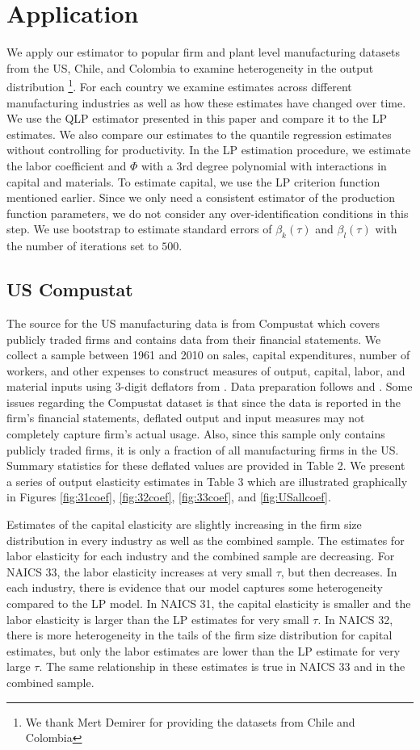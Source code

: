 \documentclass[11pt]{article}
\begin{document}
\section{Application} \label{application}
We apply our estimator to popular firm and plant level manufacturing datasets from the US, Chile, and Colombia to examine heterogeneity in the output distribution \footnote{We thank Mert Demirer for providing the datasets from Chile and Colombia}. For each country we examine estimates across different manufacturing industries as well as how these estimates have changed over time. We use the QLP estimator presented in this paper and compare it to the LP estimates. We also compare our estimates to the quantile regression estimates without controlling for productivity. In the LP estimation procedure, we estimate the labor coefficient and $\Phi$ with a 3rd degree polynomial with interactions in capital and materials. To estimate capital, we use the LP criterion function mentioned earlier. Since we only need a consistent estimator of the production function parameters, we do not consider any over-identification conditions in this step. We use bootstrap to estimate standard errors of $\beta_{k}(\tau)$ and $\beta_{l}(\tau)$ with the number of iterations set to $500$.
\subsection{US Compustat}
The source for the US manufacturing data is from Compustat which covers publicly traded firms and contains data from their financial statements. We collect a sample between 1961 and 2010 on sales, capital expenditures, number of workers, and other expenses to construct measures of output, capital, labor, and material inputs using 3-digit deflators from \cite{nber}. Data preparation follows \cite{Keller2009} and \cite{mert}. Some issues regarding the Compustat dataset is that since the data is reported in the firm's financial statements, deflated output and input measures may not completely capture firm's actual usage. Also, since this sample only contains publicly traded firms, it is only a fraction of all manufacturing firms in the US. Summary statistics for these deflated values are provided in Table 2. We present a series of output elasticity estimates in Table 3 which are illustrated graphically in Figures \ref{fig:31coef}, \ref{fig:32coef}, \ref{fig:33coef}, and \ref{fig:USallcoef}.

Estimates of the capital elasticity are slightly increasing in the firm size distribution in every industry as well as the combined sample. The estimates for labor elasticity for each industry and the combined sample are decreasing. For NAICS 33, the labor elasticity increases at very small $\tau$, but then decreases. In each industry, there is evidence that our model captures some heterogeneity compared to the LP model. In NAICS 31, the capital elasticity is smaller and the labor elasticity is larger than the LP estimates for very small $\tau$. In NAICS 32, there is more heterogeneity in the tails of the firm size distribution for capital estimates, but only the labor estimates are lower than the LP estimate for very large $\tau$. The same relationship in these estimates is true in NAICS 33 and in the combined sample.
 
\end{document}
